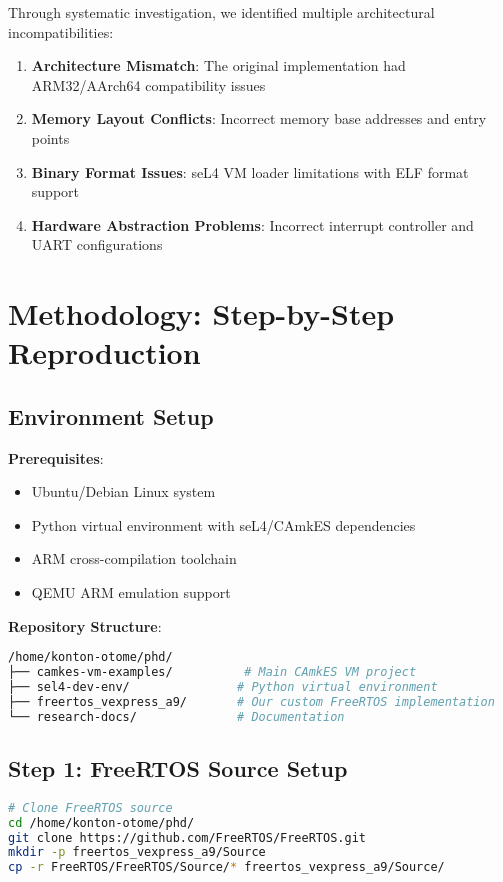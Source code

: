 \documentclass[12pt]{article}
\begin{document}
Through systematic investigation, we identified multiple architectural incompatibilities:

\begin{enumerate}
\item \textbf{Architecture Mismatch}: The original implementation had ARM32/AArch64 compatibility issues
\item \textbf{Memory Layout Conflicts}: Incorrect memory base addresses and entry points
\item \textbf{Binary Format Issues}: seL4 VM loader limitations with ELF format support
\item \textbf{Hardware Abstraction Problems}: Incorrect interrupt controller and UART configurations
\end{enumerate}

\section{Methodology: Step-by-Step Reproduction}

\subsection{Environment Setup}

\textbf{Prerequisites}:
\begin{itemize}
\item Ubuntu/Debian Linux system
\item Python virtual environment with seL4/CAmkES dependencies
\item ARM cross-compilation toolchain
\item QEMU ARM emulation support
\end{itemize}

\textbf{Repository Structure}:
\begin{lstlisting}[language=bash, caption=Project Directory Structure]
/home/konton-otome/phd/
├── camkes-vm-examples/          # Main CAmkES VM project
├── sel4-dev-env/               # Python virtual environment
├── freertos_vexpress_a9/       # Our custom FreeRTOS implementation
└── research-docs/              # Documentation
\end{lstlisting}

\subsection{Step 1: FreeRTOS Source Setup}

\begin{lstlisting}[language=bash, caption=FreeRTOS Source Acquisition]
# Clone FreeRTOS source
cd /home/konton-otome/phd/
git clone https://github.com/FreeRTOS/FreeRTOS.git
mkdir -p freertos_vexpress_a9/Source
cp -r FreeRTOS/FreeRTOS/Source/* freertos_vexpress_a9/Source/
\end{lstlisting}
\end{document}
